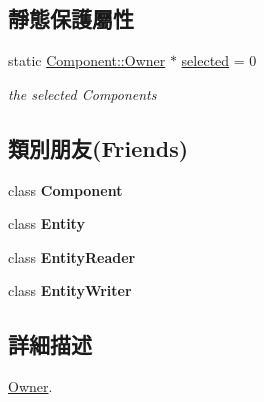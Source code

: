 \subsection*{靜態保護屬性}
\begin{DoxyCompactItemize}
\item 
static \hyperlink{class_i_dream_sky_1_1_component_1_1_owner}{Component\+::\+Owner} $\ast$ \hyperlink{class_i_dream_sky_1_1_component_1_1_owner_a9b9c76f12a399d31386b4606be7e448b}{selected} = 0\hypertarget{class_i_dream_sky_1_1_component_1_1_owner_a9b9c76f12a399d31386b4606be7e448b}{}\label{class_i_dream_sky_1_1_component_1_1_owner_a9b9c76f12a399d31386b4606be7e448b}

\begin{DoxyCompactList}\small\item\em the selected Components \end{DoxyCompactList}\end{DoxyCompactItemize}
\subsection*{類別朋友(Friends)}
\begin{DoxyCompactItemize}
\item 
class {\bfseries Component}\hypertarget{class_i_dream_sky_1_1_component_1_1_owner_a90717717700965c100968cff0188e244}{}\label{class_i_dream_sky_1_1_component_1_1_owner_a90717717700965c100968cff0188e244}

\item 
class {\bfseries Entity}\hypertarget{class_i_dream_sky_1_1_component_1_1_owner_a614439ccac0344926adc4c0165d64060}{}\label{class_i_dream_sky_1_1_component_1_1_owner_a614439ccac0344926adc4c0165d64060}

\item 
class {\bfseries Entity\+Reader}\hypertarget{class_i_dream_sky_1_1_component_1_1_owner_a56e67fba8094d0ad6c4e9a70157aeea0}{}\label{class_i_dream_sky_1_1_component_1_1_owner_a56e67fba8094d0ad6c4e9a70157aeea0}

\item 
class {\bfseries Entity\+Writer}\hypertarget{class_i_dream_sky_1_1_component_1_1_owner_a2530bdf39e07c94e0f4b49472a0ac288}{}\label{class_i_dream_sky_1_1_component_1_1_owner_a2530bdf39e07c94e0f4b49472a0ac288}

\end{DoxyCompactItemize}


\subsection{詳細描述}
\hyperlink{class_i_dream_sky_1_1_component_1_1_owner}{Owner}. 

